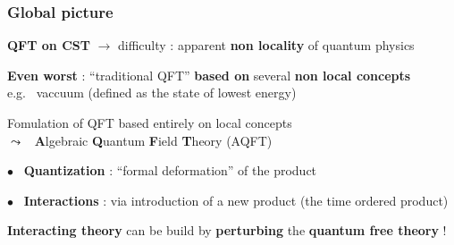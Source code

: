 \documentclass[9pt]{beamer}
\begin{document}

\begin{frame}

\frametitle{Global picture}

\vfill
 
\textdbend \quad \textbf{QFT on CST} $\to$ difficulty : apparent \textbf{non locality} of quantum physics 

\vfill

\textbf{Even worst} : ``traditional QFT'' \textbf{based on} several \textbf{non local concepts} \\

e.g. \ vaccuum (defined as the state of lowest energy) 

\vfill

\begin{block}{\vspace*{-3ex}}
\vspace*{-10pt}
\begin{center}
Fomulation of QFT based entirely on local concepts \\
$\leadsto$ \ \textbf{A}lgebraic \textbf{Q}uantum \textbf{F}ield \textbf{T}heory (AQFT) \\
\end{center}
\vspace*{-7pt}
\end{block}

\vfill

$\bullet$ \ \textbf{Quantization} : ``formal deformation'' of the product \\ 

\vfill

$\bullet$ \ \textbf{Interactions} : via introduction of a new product (the time ordered product)

\vfill

\begin{block}{\vspace*{-3ex}}
\vspace*{-10pt}
\begin{center}
\textbf{Interacting theory} can be build by \textbf{perturbing} the \textbf{quantum free theory} !
\end{center}
\vspace*{-7pt}
\end{block}

\vfill

\end{frame}
\end{document}
